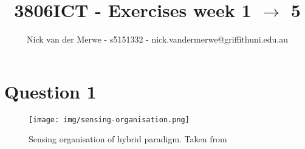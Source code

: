 \documentclass{article}
\title{3806ICT - Exercises week 1 $\rightarrow$ 5}
\author{Nick van der Merwe - s5151332 - nick.vandermerwe@griffithuni.edu.au}
\begin{document}
\maketitle

\section*{Question 1}
\begin{figure}[ht]
    \centering
    \texttt{[image: img/sensing-organisation.png]}
    \caption{Sensing organisation of hybrid paradigm. Taken from \cite{IntroToAI}}
    \label{sOrg}
\end{figure}



\end{document}
